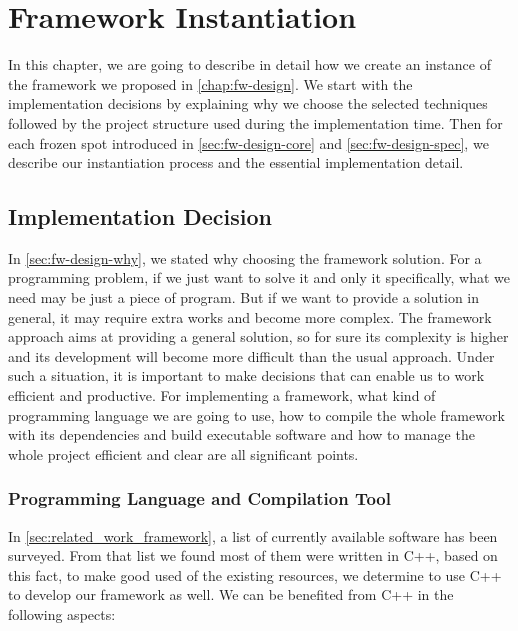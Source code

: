 \chapter{Framework Instantiation}
\label{chap:fw-inst}


In this chapter, we are going to describe in detail how we create an instance
of the framework we proposed in \autoref{chap:fw-design}. We start with the
implementation decisions by explaining why we choose the selected techniques
followed by the project structure used during the implementation time.
Then for each frozen spot introduced in \autoref{sec:fw-design-core} and
\autoref{sec:fw-design-spec}, we describe our instantiation process and the
essential implementation detail.


\section{Implementation Decision}
\label{sec:fw-inst-impl}

In \autoref{sec:fw-design-why}, we stated why choosing the framework
solution. For a programming problem, if we just want to solve it and only it 
specifically, what we need may be just a piece of program. But if we want to
provide a solution in general, it may require extra works and become more
complex. The framework approach aims at providing a general solution, so for
sure its complexity is higher and its development will become more difficult
than the usual approach.
Under such a situation, it is important to make decisions that can enable us to
work efficient and productive. For implementing a framework, what kind of
programming language we are going to use, how to compile the whole framework
with its dependencies and build executable software and how to manage the whole
project efficient and clear are all significant points.

\subsection{Programming Language and Compilation Tool}
\label{sec:fw-inst-lang-ct}

In \autoref{sec:related_work_framework}, a list of currently available software
has been surveyed. From that list we found most of them were written in C++, based
on this fact, to make good used of the existing resources, we
determine to use C++ to develop our framework as well. We can be benefited from
C++ in the following aspects:

